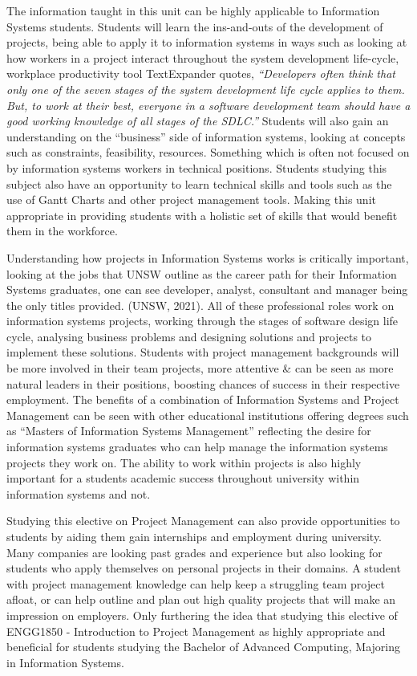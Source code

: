 The information taught in this unit can be highly applicable to Information Systems students. Students will learn the ins-and-outs of the development of projects, being able to apply it to information systems in ways such as looking at how workers in a project interact throughout the system development life-cycle, workplace productivity tool TextExpander quotes, \textit{“Developers often think that only one of the seven stages of the system development life cycle applies to them. But, to work at their best, everyone in a software development team should have a good working knowledge of all stages of the SDLC.”} \cite{TextExpander} Students will also gain an understanding on the “business” side of information systems, looking at concepts such as constraints, feasibility, resources. Something which is often not focused on by information systems workers in technical positions. Students studying this subject also have an opportunity to learn technical skills and tools such as the use of Gantt Charts and other project management tools. Making this unit appropriate in providing students with a holistic set of skills that would benefit them in the workforce.


Understanding how projects in Information Systems works is critically important, looking at the jobs that UNSW outline as the career path for their Information Systems graduates, one can see developer, analyst, consultant and manager being the only titles provided. (UNSW, 2021). All of these professional roles work on information systems projects, working through the stages of software design life cycle, analysing business problems and designing solutions and projects to implement these solutions. Students with project management backgrounds will be more involved in their team projects, more attentive & can be seen as more natural leaders in their positions, boosting chances of success in their respective employment. The benefits of a combination of Information Systems and Project Management can be seen with other educational institutions offering degrees such as “Masters of Information Systems Management” \cite{Macquarie} reflecting the desire for information systems graduates who can help manage the information systems projects they work on. The ability to work within projects is also highly important for a students academic success throughout university within information systems and not.



Studying this elective on Project Management can also provide opportunities to students by aiding them gain internships and employment during university. Many companies are looking past grades and experience but also looking for students who apply themselves on personal projects in their domains. A student with project management knowledge can help keep a struggling team project afloat, or can help outline and plan out high quality projects that will make an impression on employers. Only furthering the idea that studying this elective of ENGG1850 - Introduction to Project Management as highly appropriate and beneficial for students studying the Bachelor of Advanced Computing, Majoring in Information Systems.




